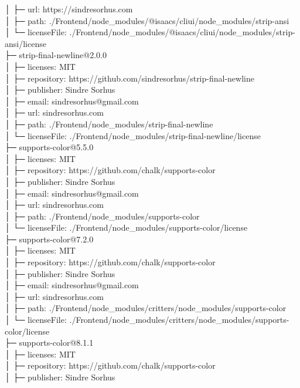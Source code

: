 │  ├─ url: https://sindresorhus.com\\
│  ├─ path: ./Frontend/node\_modules/@isaacs/cliui/node\_modules/strip-ansi\\
│  └─ licenseFile: ./Frontend/node\_modules/@isaacs/cliui/node\_modules/strip-ansi/license\\
├─ strip-final-newline@2.0.0\\
│  ├─ licenses: MIT\\
│  ├─ repository: https://github.com/sindresorhus/strip-final-newline\\
│  ├─ publisher: Sindre Sorhus\\
│  ├─ email: sindresorhus@gmail.com\\
│  ├─ url: sindresorhus.com\\
│  ├─ path: ./Frontend/node\_modules/strip-final-newline\\
│  └─ licenseFile: ./Frontend/node\_modules/strip-final-newline/license\\
├─ supports-color@5.5.0\\
│  ├─ licenses: MIT\\
│  ├─ repository: https://github.com/chalk/supports-color\\
│  ├─ publisher: Sindre Sorhus\\
│  ├─ email: sindresorhus@gmail.com\\
│  ├─ url: sindresorhus.com\\
│  ├─ path: ./Frontend/node\_modules/supports-color\\
│  └─ licenseFile: ./Frontend/node\_modules/supports-color/license\\
├─ supports-color@7.2.0\\
│  ├─ licenses: MIT\\
│  ├─ repository: https://github.com/chalk/supports-color\\
│  ├─ publisher: Sindre Sorhus\\
│  ├─ email: sindresorhus@gmail.com\\
│  ├─ url: sindresorhus.com\\
│  ├─ path: ./Frontend/node\_modules/critters/node\_modules/supports-color\\
│  └─ licenseFile: ./Frontend/node\_modules/critters/node\_modules/supports-color/license\\
├─ supports-color@8.1.1\\
│  ├─ licenses: MIT\\
│  ├─ repository: https://github.com/chalk/supports-color\\
│  ├─ publisher: Sindre Sorhus\\
